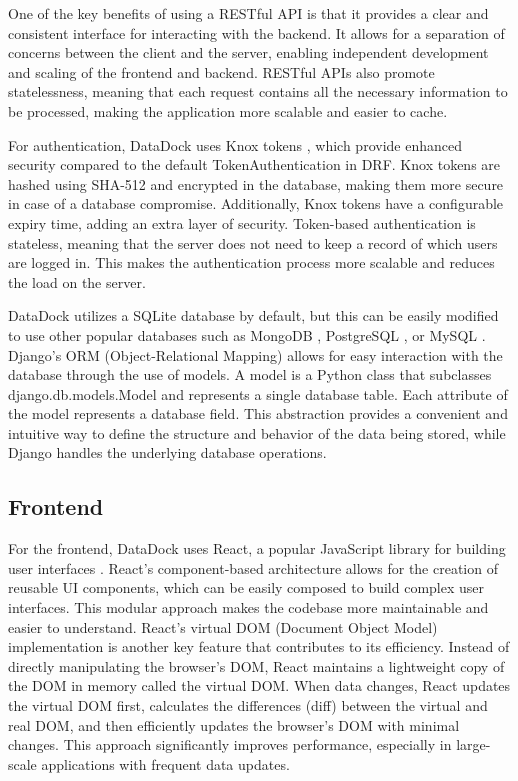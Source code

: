 \documentclass[conference]{IEEEtran}
\begin{document}
One of the key benefits of using a RESTful API is that it provides a clear and consistent interface for interacting with the backend. It allows for a separation of concerns between the client and the server, enabling independent development and scaling of the frontend and backend. RESTful APIs also promote statelessness, meaning that each request contains all the necessary information to be processed, making the application more scalable and easier to cache.

For authentication, DataDock uses Knox tokens \cite{knox}, which provide enhanced security compared to the default TokenAuthentication in DRF. Knox tokens are hashed using SHA-512 and encrypted in the database, making them more secure in case of a database compromise. Additionally, Knox tokens have a configurable expiry time, adding an extra layer of security. Token-based authentication is stateless, meaning that the server does not need to keep a record of which users are logged in. This makes the authentication process more scalable and reduces the load on the server.

DataDock utilizes a SQLite database by default, but this can be easily modified to use other popular databases such as MongoDB \cite{mongodb}, PostgreSQL \cite{postgresql}, or MySQL \cite{mysql}. Django's ORM (Object-Relational Mapping) allows for easy interaction with the database through the use of models. A model is a Python class that subclasses django.db.models.Model and represents a single database table. Each attribute of the model represents a database field. This abstraction provides a convenient and intuitive way to define the structure and behavior of the data being stored, while Django handles the underlying database operations.

\subsection{Frontend}
For the frontend, DataDock uses React, a popular JavaScript library for building user interfaces \cite{react}. React's component-based architecture allows for the creation of reusable UI components, which can be easily composed to build complex user interfaces. This modular approach makes the codebase more maintainable and easier to understand. React's virtual DOM (Document Object Model) implementation is another key feature that contributes to its efficiency. Instead of directly manipulating the browser's DOM, React maintains a lightweight copy of the DOM in memory called the virtual DOM. When data changes, React updates the virtual DOM first, calculates the differences (diff) between the virtual and real DOM, and then efficiently updates the browser's DOM with minimal changes. This approach significantly improves performance, especially in large-scale applications with frequent data updates.
\end{document}
